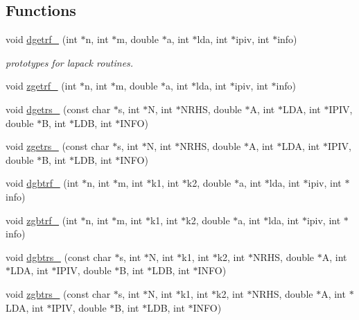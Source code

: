 \subsection*{Functions}
\begin{DoxyCompactItemize}
\item 
void \hyperlink{namespaceodes_af0b7a0203a69c4fa322079ad196cdcae}{dgetrf\-\_\-} (int $\ast$n, int $\ast$m, double $\ast$a, int $\ast$lda, int $\ast$ipiv, int $\ast$info)
\begin{DoxyCompactList}\small\item\em prototypes for lapack routines. \end{DoxyCompactList}\item 
void \hyperlink{namespaceodes_a68cd3ad2ee6d143463ea0a41971b45ca}{zgetrf\-\_\-} (int $\ast$n, int $\ast$m, double $\ast$a, int $\ast$lda, int $\ast$ipiv, int $\ast$info)
\item 
void \hyperlink{namespaceodes_acb38308231063d618ca8f4bfcf8f3912}{dgetrs\-\_\-} (const char $\ast$s, int $\ast$N, int $\ast$N\-R\-H\-S, double $\ast$A, int $\ast$L\-D\-A, int $\ast$I\-P\-I\-V, double $\ast$B, int $\ast$L\-D\-B, int $\ast$I\-N\-F\-O)
\item 
void \hyperlink{namespaceodes_ab6f6bedf50ce1e3b9e01f7cacbd5a9a8}{zgetrs\-\_\-} (const char $\ast$s, int $\ast$N, int $\ast$N\-R\-H\-S, double $\ast$A, int $\ast$L\-D\-A, int $\ast$I\-P\-I\-V, double $\ast$B, int $\ast$L\-D\-B, int $\ast$I\-N\-F\-O)
\item 
void \hyperlink{namespaceodes_a84c781070989698cdb58c37a5074a91c}{dgbtrf\-\_\-} (int $\ast$n, int $\ast$m, int $\ast$k1, int $\ast$k2, double $\ast$a, int $\ast$lda, int $\ast$ipiv, int $\ast$info)
\item 
void \hyperlink{namespaceodes_ae9a95c96e0823f5ac279e572fba93550}{zgbtrf\-\_\-} (int $\ast$n, int $\ast$m, int $\ast$k1, int $\ast$k2, double $\ast$a, int $\ast$lda, int $\ast$ipiv, int $\ast$info)
\item 
void \hyperlink{namespaceodes_a8ef9d46ddb5b78777217d2162ac4470f}{dgbtrs\-\_\-} (const char $\ast$s, int $\ast$N, int $\ast$k1, int $\ast$k2, int $\ast$N\-R\-H\-S, double $\ast$A, int $\ast$L\-D\-A, int $\ast$I\-P\-I\-V, double $\ast$B, int $\ast$L\-D\-B, int $\ast$I\-N\-F\-O)
\item 
void \hyperlink{namespaceodes_ad56f5a1a4c30315e999fb0c3f1be7c24}{zgbtrs\-\_\-} (const char $\ast$s, int $\ast$N, int $\ast$k1, int $\ast$k2, int $\ast$N\-R\-H\-S, double $\ast$A, int $\ast$L\-D\-A, int $\ast$I\-P\-I\-V, double $\ast$B, int $\ast$L\-D\-B, int $\ast$I\-N\-F\-O)

\end{DoxyCompactItemize}
